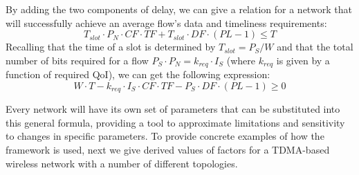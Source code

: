 By adding the two components of delay, we can give a relation for a network that will successfully achieve an average flow's data and timeliness requirements:
\begin{equation*}
	T_{slot} \cdot P_N \cdot CF \cdot TF + T_{slot} \cdot DF \cdot (PL-1) \leq T
\end{equation*}
Recalling that the time of a slot is determined by %
$T_{slot} = P_S/W$ %
and that the total number of bits required for a flow $P_S \cdot P_N =  k_{req} \cdot I_S$ (where $k_{req}$ is given by a function of required QoI), we can get the following expression:
\begin{equation}
	W \cdot T - k_{req} \cdot I_S \cdot CF \cdot TF - P_S \cdot DF \cdot (PL-1) \geq 0	
	\label{eq:general_scal}
\end{equation}

Every network will have its own set of parameters that can be substituted into this general formula, providing a tool to approximate limitations and sensitivity to changes in specific parameters. To provide concrete examples of how the framework is used, next we give derived values of factors for a TDMA-based wireless network with a number of different topologies.




